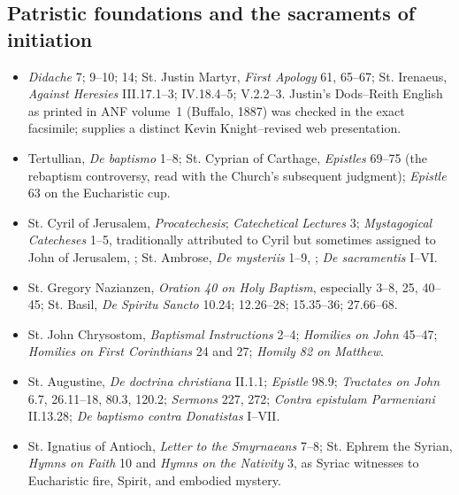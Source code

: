 \subsection*{Patristic foundations and the sacraments of initiation}
{\footnotesize
\begin{itemize}[nosep]
\item \emph{Didache} 7; 9--10; 14; St. Justin Martyr, \emph{First Apology} 61, 65--67; St. Irenaeus, \emph{Against Heresies} III.17.1--3; IV.18.4--5; V.2.2--3. Justin's Dods--Reith English as printed in ANF volume~1 (Buffalo, 1887) was checked in the exact facsimile;  supplies a distinct Kevin Knight--revised web presentation.
\item Tertullian, \emph{De baptismo} 1--8; St. Cyprian of Carthage, \emph{Epistles} 69--75 (the rebaptism controversy, read with the Church's subsequent judgment); \emph{Epistle} 63 on the Eucharistic cup.
\item St. Cyril of Jerusalem, \emph{Procatechesis}; \emph{Catechetical Lectures} 3; \emph{Mystagogical Catecheses} 1--5, traditionally attributed to Cyril but sometimes assigned to John of Jerusalem, ; St. Ambrose, \emph{De mysteriis} 1--9, ; \emph{De sacramentis} I--VI.
\item St. Gregory Nazianzen, \emph{Oration 40 on Holy Baptism}, especially 3--8, 25, 40--45; St. Basil, \emph{De Spiritu Sancto} 10.24; 12.26--28; 15.35--36; 27.66--68.
\item St. John Chrysostom, \emph{Baptismal Instructions} 2--4; \emph{Homilies on John} 45--47; \emph{Homilies on First Corinthians} 24 and 27; \emph{Homily 82 on Matthew}.
\item St. Augustine, \emph{De doctrina christiana} II.1.1; \emph{Epistle} 98.9; \emph{Tractates on John} 6.7, 26.11--18, 80.3, 120.2; \emph{Sermons} 227, 272; \emph{Contra epistulam Parmeniani} II.13.28; \emph{De baptismo contra Donatistas} I--VII.
\item St. Ignatius of Antioch, \emph{Letter to the Smyrnaeans} 7--8; St. Ephrem the Syrian, \emph{Hymns on Faith} 10 and \emph{Hymns on the Nativity} 3, as Syriac witnesses to Eucharistic fire, Spirit, and embodied mystery.
\end{itemize}
}

